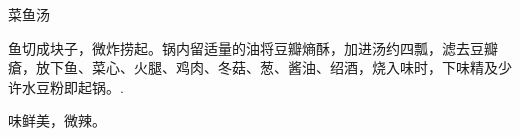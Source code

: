 \begin{recipe}{菜鱼汤}

\ingredients


\cooking

鱼切成块子，微炸捞起。锅内留适量的油将豆瓣熵酥，加进汤约四瓢，滤去豆瓣瘡，放下鱼、菜心、火腿、鸡肉、冬菇、葱、酱油、绍酒，烧入味时，下味精及少许水豆粉即起锅。.

\notes

味鲜美，微辣。

\end{recipe}

